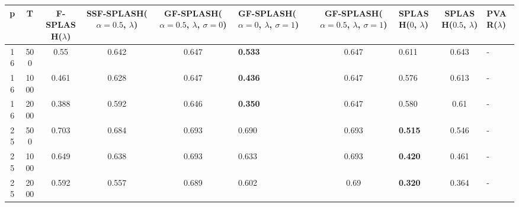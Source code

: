 \begin{tabular}{ccccclclcl}
\hline
  p  &  T   &  F-SPLASH($\lambda$)  &  SSF-SPLASH($\alpha=0.5$, $\lambda$)  &  GF-SPLASH($\alpha=0.5$, $\lambda$, $\sigma=0$)  & GF-SPLASH($\alpha=0$, $\lambda$, $\sigma=1$)   &  GF-SPLASH($\alpha=0.5$, $\lambda$, $\sigma=1$)  & SPLASH($0$, $\lambda$)   &  SPLASH($0.5$, $\lambda$)  & PVAR($\lambda$)   \\
\hline
 16  & 500  &         0.55          &                 0.642                 &                      0.647                       & \textbf{0.533}                                 &                      0.647                       & 0.611                    &           0.643            & -                 \\
 16  & 1000 &         0.461         &                 0.628                 &                      0.647                       & \textbf{0.436}                                 &                      0.647                       & 0.576                    &           0.613            & -                 \\
 16  & 2000 &         0.388         &                 0.592                 &                      0.646                       & \textbf{0.350}                                 &                      0.647                       & 0.580                    &            0.61            & -                 \\
 25  & 500  &         0.703         &                 0.684                 &                      0.693                       & 0.690                                          &                      0.693                       & \textbf{0.515}           &           0.546            & -                 \\
 25  & 1000 &         0.649         &                 0.638                 &                      0.693                       & 0.633                                          &                      0.693                       & \textbf{0.420}           &           0.461            & -                 \\
 25  & 2000 &         0.592         &                 0.557                 &                      0.689                       & 0.602                                          &                       0.69                       & \textbf{0.320}           &           0.364            & -                 \\
\hline
\end{tabular}